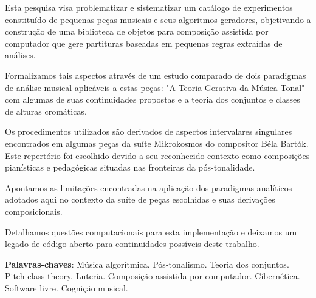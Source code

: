 \documentclass[
	12pt,				%
	openright,			%
	twoside,			%
	a4paper,			%
	english,			%
	french,				%
	spanish,			%
	brazil				%
	]{abntex2}
\begin{document}
\setlength{\absparsep}{18pt} %
\begin{resumo}


Esta pesquisa visa problematizar e sistematizar um catálogo de experimentos constituído de pequenas peças musicais e seus algoritmos geradores, objetivando a construção de uma biblioteca de objetos para composição assistida por computador que gere partituras baseadas em pequenas regras extraídas de análises.

Formalizamos tais aspectos através de um estudo comparado de dois paradigmas de análise musical aplicáveis a estas peças: "A Teoria Gerativa da Música Tonal"\cite{lerdahl1983generative} com algumas de suas continuidades propostas \cite{lerdahl2009genesis,temperley2001cognition} e a teoria dos conjuntos e classes de alturas cromáticas.\cite{forte1973structure,straus2004}

Os procedimentos utilizados são derivados de aspectos intervalares singulares encontrados em algumas peças da suíte Mikrokosmos do compositor Béla Bartók. Este repertório foi escolhido devido a seu reconhecido contexto como composições pianísticas e pedagógicas situadas nas fronteiras da pós-tonalidade. 

Apontamos as limitações encontradas na aplicação dos paradigmas analíticos adotados aqui no contexto da suíte de peças escolhidas e suas derivações composicionais.

Detalhamos questões computacionais para esta implementação e deixamos um legado de código aberto para continuidades possíveis deste trabalho.


 \textbf{Palavras-chaves}: Música algorítmica. Pós-tonalismo. Teoria dos conjuntos. Pitch class theory. Luteria. Composição assistida por computador. Cibernética. Software livre. Cognição musical.
\end{resumo}
\end{document}

